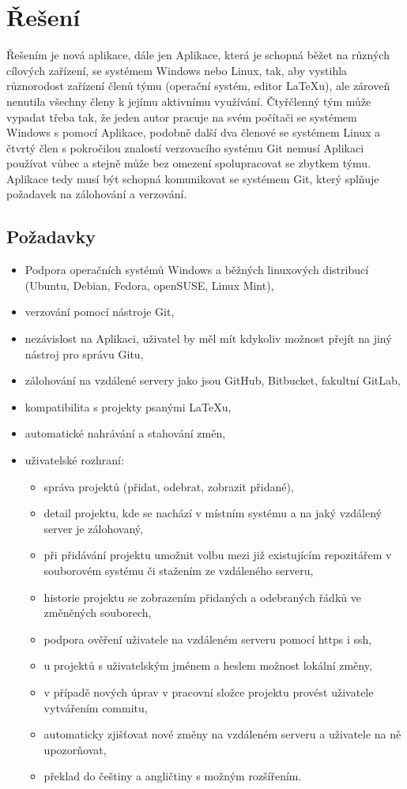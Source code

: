 \chapter{Řešení}
Řešením je nová aplikace, dále jen Aplikace, která je schopná běžet na různých cílových zařízení, se systémem Windows nebo Linux, tak, aby vystihla různorodost zařízení členů týmu (operační systém, editor LaTeXu), ale zároveň nenutila všechny členy k jejímu aktivnímu využívání. Čtyřčlenný tým může vypadat třeba tak, že jeden autor pracuje na svém počítači se systémem Windows s pomocí Aplikace, podobně další dva členové se systémem Linux a čtvrtý člen s pokročilou znalostí verzovacího systému Git nemusí Aplikaci používat vůbec a stejně může bez omezení spolupracovat se zbytkem týmu. Aplikace tedy musí být schopná komunikovat se systémem Git, který splňuje požadavek na zálohování a verzování.

\section{Požadavky}

\begin{itemize}
	\item Podpora operačních systémů Windows a běžných linuxových distribucí (Ubuntu, Debian, Fedora, openSUSE, Linux Mint),
	\item verzování pomocí nástroje Git,
	\item nezávislost na Aplikaci, uživatel by měl mít kdykoliv možnost přejít na jiný nástroj pro správu Gitu,
	\item zálohování na vzdálené servery jako jsou GitHub, Bitbucket, fakultní GitLab,
	\item kompatibilita s projekty psanými \LaTeX{u},
	\item automatické nahrávání a stahování změn,
	\item uživatelské rozhraní:
		\begin{itemize}
			\item správa projektů (přidat, odebrat, zobrazit přidané),
			\item detail projektu, kde se nachází v místním systému a na jaký vzdálený server je zálohovaný,
			\item při přidávání projektu umožnit volbu mezi již existujícím repozitářem v souborovém systému či stažením ze vzdáleného serveru,
			\item historie projektu se zobrazením přidaných a odebraných řádků ve změněných souborech,
			\item podpora ověření uživatele na vzdáleném serveru pomocí https i ssh,
			\item u projektů s uživatelským jménem a heslem možnost lokální změny,
			\item v případě nových úprav v pracovní složce projektu provést uživatele vytvářením commitu,
			\item automaticky zjišťovat nové změny na vzdáleném serveru a uživatele na ně upozorňovat,
			\item překlad do češtiny a angličtiny s možným rozšířením.
		\end{itemize}
\end{itemize}



